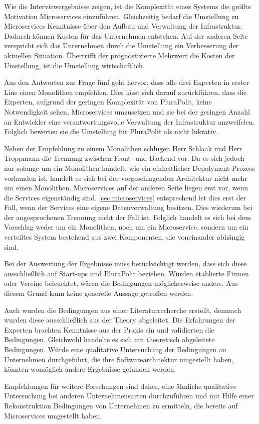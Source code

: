 Wie die Interviewergebnisse zeigen, ist die Komplexität eines Systems die größte Motivation Microservices einzuführen. Gleichzeitig bedarf die Umstellung zu Microservices Kenntnisse über den Aufbau und Verwaltung der Infrastruktur. Dadurch können Kosten für das Unternehmen entstehen. Auf der anderen Seite verspricht sich das Unternehmen durch die Umstellung ein Verbesserung der aktuellen Situation. Übertrifft der prognostizierte Mehrwert die Kosten der Umstellung, ist die Umstellung wirtschaftlich.

Aus den Antworten zur Frage fünf geht hervor, dass alle drei Experten in erster Line einen Monolithen empfehlen. Dies lässt sich darauf zurückführen, dass die Experten, aufgrund der geringen Komplexität von PluraPolit, keine Notwendigkeit sehen, Microservices umzusetzen und sie bei der geringen Anzahl an Entwickler eine verantwortungsvolle Verwaltung der Infrastruktur anzweifelen. Folglich bewerten sie die Umstellung für PluraPolit als nicht lukrativ.

Neben der Empfehlung zu einem Monolithen schlugen Herr Schlaak und Herr Troppmann die Trennung zwischen Front- und Backend vor.
Da es sich jedoch nur solange um ein Monolithen handelt, wie ein einheitlicher Depolyment-Prozess vorhanden ist, handelt es sich bei der vorgeschlagenden Architektur nicht mehr um einen Monolithen.
Microservices auf der anderen Seite liegen erst vor, wenn die Services eigenständig sind. \cref{sec:microservices} entsprechend ist dies erst der Fall, wenn der Services eine eigene Datenverwaltung besitzen. Dies wiederum bei der angesprochenen Trennung nicht der Fall ist. Folglich handelt es sich bei dem Vorschlag weder um ein Monolithen, noch um ein Microservice, sondern um ein verteiltes System bestehend aus zwei Komponenten, die voneinander abhängig sind.

Bei der Auswertung der Ergebnisse muss berücksichtigt werden, dass sich diese ausschließlich auf Start-ups und PluraPolit beziehen. Würden etablierte Firmen oder Vereine beleuchtet, wären die Bedingungen möglicherweise anders. Aus diesem Grund kann keine generelle Aussage getroffen werden.

Auch wurden die Bedingungen aus einer Literaturrecherche erstellt, demnach wurden diese ausschließlich aus der Theory abgeleitet. Die Erfahrungen der Experten brachten Kenntnisse aus der Praxis ein und validierten die Bedingungen. 
Gleichwohl handelte es sich um theoretisch abgeleitete Bedingungen.
Würde eine qualitative Untersuchung der Bedingungen an Unternehmen durchgeführt, die ihre Softwarearchitektur umgestellt haben, könnten womöglich andere Ergebnisse gefunden werden.

Empfehlungen für weitere Forschungen sind daher, eine ähnliche qualitative Untersuchung bei anderen Unternehmensarten durchzuführen und mit Hilfe einer Rekonstruktion Bedingungen von Unternehmen zu ermitteln, die bereits auf Microservices umgestellt haben.
